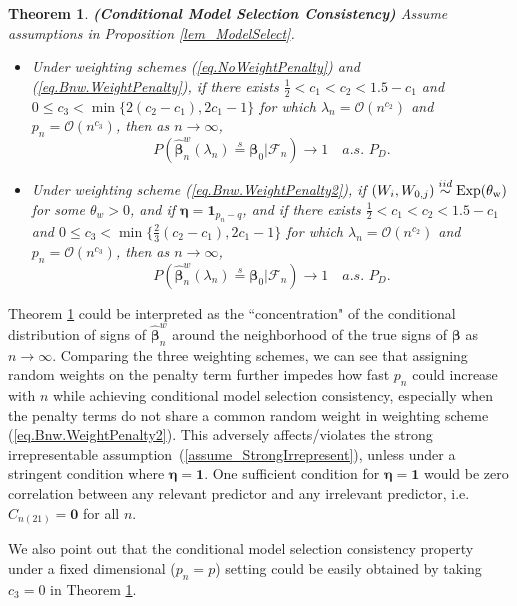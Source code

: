 \documentclass[ejs,authoryear,linksfromyear]{imsart}
\newcommand{\bnw}{\widehat{\bm{\beta}}_n^w} %
\numberwithin{equation}{section}
\theoremstyle{plain}
\newtheorem{thm}{Theorem}[section]
\begin{document}
\begin{thm} \label{thm_Model_Select}
	\textbf{(Conditional Model Selection Consistency)} Assume assumptions in Proposition \ref{lem_ModelSelect}. 
	\begin{itemize}
		\item [(a)] Under weighting schemes (\ref{eq.NoWeightPenalty}) and (\ref{eq.Bnw.WeightPenalty}), if there exists $\frac{1}{2} < c_1 <  c_2 < 1.5 - c_1$ and $0 \leq c_3 < \min \{ 2(c_2 - c_1), 2c_1 - 1 \}$ for which $\lambda_n = \mathcal{O} \left( n^{c_2} \right)$ and $p_n = \mathcal{O} \left( n^{c_3} \right)$, then as $n \to \infty$,
		$$
		P\left(
		\bnw (\lambda_n) \stackrel{s}{=} \bm{\beta}_0
		\big| \mathcal{F}_n 
		\right)	
		\to 1
		\quad a.s. \,\, P_D. 
		$$   
		\item [(b)] Under weighting scheme (\ref{eq.Bnw.WeightPenalty2}), if $(W_i, W_{0,j}) \stackrel{iid}{\sim} \rm{Exp} (\theta_w)$ for some $\theta_w > 0$, and if $\bm{\eta} = \bm{1}_{p_n-q}$, and if there exists $\frac{1}{2} < c_1 <  c_2 < 1.5 - c_1$ and $0 \leq c_3 < \min \{ \frac{2}{3}(c_2 - c_1), 2c_1 - 1 \}$ for which $\lambda_n = \mathcal{O} \left( n^{c_2} \right)$ and $p_n = \mathcal{O} \left( n^{c_3} \right)$, then as $n \to \infty$,
		$$
		P\left(
		\bnw (\lambda_n) \stackrel{s}{=} \bm{\beta}_0
		\big| \mathcal{F}_n 
		\right)	
		\to 1
		\quad a.s. \,\, P_D. 
		$$
	\end{itemize}
\end{thm}

Theorem \ref{thm_Model_Select} could be interpreted as the ``concentration" of the conditional distribution of signs of $\bnw$ around the neighborhood of the true signs of $\bm{\beta}$ as $n \to \infty$. Comparing the three weighting schemes, we can see that assigning random weights on the penalty term further impedes how fast $p_n$ could increase with $n$ while achieving conditional model selection consistency, especially when the penalty terms do not share a common random weight in weighting scheme (\ref{eq.Bnw.WeightPenalty2}). This adversely affects/violates the strong irrepresentable assumption~(\ref{assume_StrongIrrepresent}), unless under a stringent condition where $\bm{\eta} = \bm{1}$. One sufficient condition for  $\bm{\eta} = \bm{1}$ would be zero correlation between any relevant predictor and any irrelevant predictor, i.e. $C_{n(21)} = \bm{0}$ for all $n$. 

We also point out that the conditional model selection consistency property under a fixed dimensional ($p_n = p$) setting could be easily obtained by taking $c_3 = 0$ in Theorem \ref{thm_Model_Select}. \\
\end{document}

